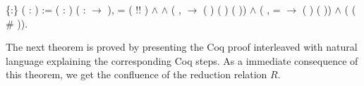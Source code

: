 \documentclass[a4paper]{article}
\begin{document}
\begin{coqdoccode}
  \coqdocemptyline \coqdocnoindent {}
   \{:\} (
  : ) := \coqdoctac{\ensuremath{\exists}}
  ( :  )
  ( : 
  \ensuremath{\rightarrow} ),  =
  ( !\coqdocvar{\_}! ) \ensuremath{\land}
    
  \ensuremath{\land} (\coqdockw{\ensuremath{\forall}} 
  ,   
  \ensuremath{\rightarrow} ( )
  ( ) ( ))
  \ensuremath{\land} (\coqdockw{\ensuremath{\forall}} 
  ,  =  
  \ensuremath{\rightarrow} ( )
   ( )) \ensuremath{\land}
  (  
  ( \# )).\coqdoceol \coqdocemptyline
  \coqdocemptyline
\end{coqdoccode}

The next theorem is proved by presenting the Coq proof interleaved with natural language explaining the corresponding Coq steps. As a immediate consequence of this theorem, we get the confluence of the reduction relation $R$.
\end{document}
